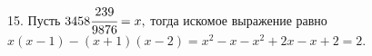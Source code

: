15. Пусть $3458\cfrac{239}{9876}=x,$ тогда искомое выражение равно $x(x-1)-(x+1)(x-2)=x^2-x-x^2+2x-x+2=2.$\\
